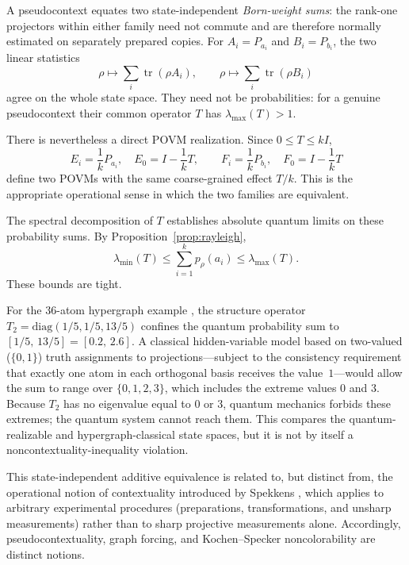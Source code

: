 \documentclass[
  twocolumn,
  aps,
  pra,
  floatfix,
  amsmath,amssymb,
  longbibliography
]{revtex4-2}
\theoremstyle{definition}
\theoremstyle{remark}
\begin{document}
A pseudocontext equates two state-independent \emph{Born-weight sums}:
the rank-one projectors within either family need not commute and are
therefore normally estimated on separately prepared copies.  For
$A_i=P_{a_i}$ and $B_i=P_{b_i}$, the two linear statistics
\[
  \rho\longmapsto\sum_i\operatorname{tr}(\rho A_i),\qquad
  \rho\longmapsto\sum_i\operatorname{tr}(\rho B_i)
\]
agree on the whole state space.  They need not be probabilities: for a
genuine pseudocontext their common operator $T$ has
$\lambda_{\max}(T)>1$.

There is nevertheless a direct POVM realization.  Since $0\le T\le kI$,
\[
 E_i=\frac1kP_{a_i},\quad E_0=I-\frac1kT,
 \qquad
 F_i=\frac1kP_{b_i},\quad F_0=I-\frac1kT
\]
define two POVMs with the same coarse-grained effect $T/k$.  This is the
appropriate operational sense in which the two families are equivalent.

The spectral decomposition of $T$ establishes absolute quantum limits
on these probability sums.  By Proposition~\ref{prop:rayleigh},
\begin{equation}
  \lambda_{\min}(T)\le\sum_{i=1}^{k}p_\rho(a_i)\le\lambda_{\max}(T).
  \label{eq:qbounds}
\end{equation}
These bounds are tight.

For the 36-atom hypergraph example \cite{2023-navara-svozil}, the
structure operator $T_2=\mathrm{diag}(1/5,1/5,13/5)$ confines the
quantum probability sum to $[1/5,\,13/5]=[0.2,\,2.6]$.  A classical
hidden-variable model based on two-valued ($\{0,1\}$) truth
assignments to projections---subject to the consistency requirement
that exactly one atom in each orthogonal basis receives the
value~$1$---would allow the sum to range over $\{0,1,2,3\}$, which
includes the extreme values $0$ and $3$.  Because $T_2$ has no
eigenvalue equal to $0$ or $3$, quantum mechanics forbids these
extremes; the quantum system cannot reach them.  This compares the
quantum-realizable and hypergraph-classical state spaces, but it is not
by itself a noncontextuality-inequality violation.

This state-independent additive equivalence is related to, but
distinct from, the operational notion of contextuality introduced by
Spekkens \cite{Spekkens-04}, which applies to arbitrary experimental
procedures (preparations, transformations, and unsharp measurements)
rather than to sharp projective measurements alone.  Accordingly,
pseudocontextuality, graph forcing, and Kochen--Specker noncolorability
are distinct notions.
\end{document}
